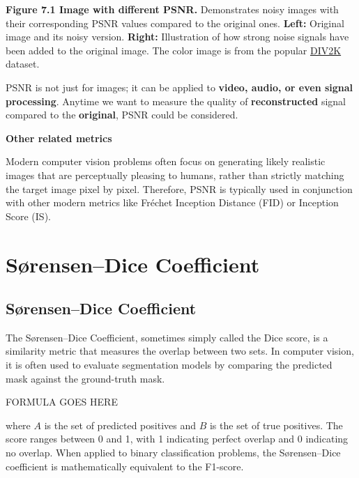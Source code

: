 \textbf{Figure 7.1 Image with different PSNR.} Demonstrates noisy images with their corresponding PSNR values compared to the
original ones. \textbf{Left:} Original image and its noisy version. 
\textbf{Right:} Illustration of how strong noise signals have been added to the original image.
The color image is from the popular \href{https://data.vision.ee.ethz.ch/cvl/DIV2K/}{DIV2K} dataset.
\vspace{-12pt} 

{PSNR is not just for images; it can be applied to \textbf{video, audio, or even signal processing}. Anytime we want to
measure the quality of \textbf{reconstructed} signal compared to the \textbf{original}, PSNR could be considered.}

\vspace{-5pt} 

\textbf{Other related metrics}

\vspace{-5pt} 

Modern computer vision problems often focus on generating likely realistic images that are perceptually pleasing to humans,
rather than strictly matching the
target image pixel by pixel. Therefore, PSNR is typically used in conjunction with other modern metrics like Fréchet Inception
Distance (FID) or Inception Score (IS).


\clearpage
\thispagestyle{cvstyle}
\section{S{\o}rensen–Dice Coefficient}
\subsection{S{\o}rensen–Dice Coefficient}


The S{\o}rensen–Dice Coefficient, sometimes simply called the Dice score, is a similarity metric that
measures the overlap between two sets. In computer vision, it is often used to evaluate segmentation
models by comparing the predicted mask against the ground-truth mask.

\begin{center}
    FORMULA GOES HERE
\end{center}

where $A$ is the set of predicted positives and $B$ is the set of true positives.
The score ranges between 0 and 1, with 1 indicating perfect overlap and 0 indicating no overlap.
When applied to binary classification problems, the S{\o}rensen–Dice coefficient is mathematically
equivalent to the F1-score.

